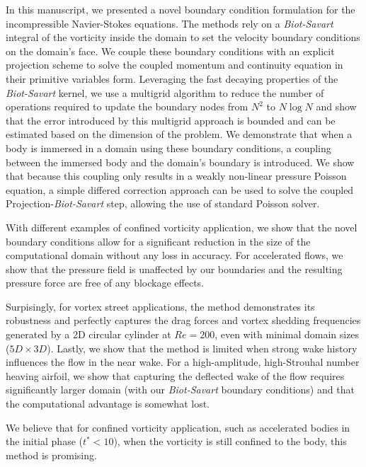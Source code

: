 \documentclass[preprint,12pt]{elsarticle}
\begin{document}
In this manuscript, we presented a novel boundary condition formulation for the incompressible Navier-Stokes equations. The methods rely on a \emph{Biot-Savart} integral of the vorticity inside the domain to set the velocity boundary conditions on the domain's face. We couple these boundary conditions with an explicit projection scheme to solve the coupled momentum and continuity equation in their primitive variables form. Leveraging the fast decaying properties of the \emph{Biot-Savart} kernel, we use a multigrid algorithm to reduce the number of operations required to update the boundary nodes from $N^2$ to $N\log N$ and show that the error introduced by this multigrid approach is bounded and can be estimated based on the dimension of the problem. We demonstrate that when a body is immersed in a domain using these boundary conditions, a coupling between the immersed body and the domain's boundary is introduced. We show that because this coupling only results in a weakly non-linear pressure Poisson equation, a simple differed correction approach can be used to solve the coupled Projection-\emph{Biot-Savart} step, allowing the use of standard Poisson solver.

With different examples of confined vorticity application, we show that the novel boundary conditions allow for a significant reduction in the size of the computational domain without any loss in accuracy. For accelerated flows, we show that the pressure field is unaffected by our boundaries and the resulting pressure force are free of any blockage effects.

Surpisingly, for vortex street applications, the method demonstrates its robustness and perfectly captures the drag forces and vortex shedding frequencies generated by a 2D circular cylinder at $Re=200$, even with minimal domain sizes ($5D\times3D$). Lastly, we show that the method is limited when strong wake history influences the flow in the near wake. For a high-amplitude, high-Strouhal number heaving airfoil, we show that capturing the deflected wake of the flow requires significantly larger domain (with our \emph{Biot-Savart} boundary conditions) and that the computational advantage is somewhat lost.

We believe that for confined vorticity application, such as accelerated bodies in the initial phase ($t^*<10$), when the vorticity is still confined to the body, this method is promising.

\end{document}
